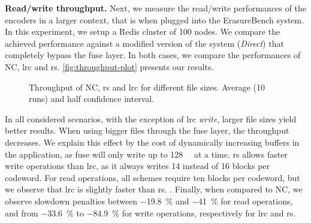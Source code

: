 \textbf{Read/write throughput.}
Next, we measure the read/write performances of the encoders in a larger context, that is when plugged into the ErasureBench system.
In this experiment, we setup a Redis cluster of 100 nodes.
We compare the achieved performance against a modified version of the system (\textit{Direct}) that completely bypass the \ac{fuse} layer.
In both cases, we compare the performances of NC, \ac{lrc} and \ac{rs}. %
\autoref{fig:throughput-plot} presents our results.
\begin{figure*}[t]
    \centering
    
    \caption{Throughput of NC, \ac{rs} and \ac{lrc} for different file sizes. Average (10 runs) and half confidence interval.}
    \label{fig:throughput-plot}
\end{figure*}
In all considered scenarios, with the exception of \ac{lrc} \textit{write}, larger file sizes yield better results.
When using bigger files through the \ac{fuse} layer, the throughput decreases.
We explain this effect by the cost of dynamically increasing buffers in the application, as \ac{fuse} will only write up to \SI{128}{\kibi\byte} at a time.
\ac{rs} allows faster write operations than \ac{lrc}, as it always writes 14 instead of 16 blocks per codeword.
For read operations, all schemes require ten blocks per codeword, but we observe that \ac{lrc} is slightly faster than \ac{rs}. . 
Finally, when compared to NC, we observe slowdown penalties between \SI{-19.8}{\percent} and \SI{-41}{\percent} for read operations, and from \SI{-33.6}{\percent} to \SI{-84.9}{\percent} for write operations, respectively for \ac{lrc} and \ac{rs}.


